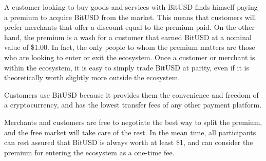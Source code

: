 A customer looking to buy goods and services with BitUSD finds himself paying a
premium to acquire BitUSD from the market. This means that customers will
prefer merchants that offer a discount equal to the premium paid. On the other
hand, the premium is a wash for a customer that earned BitUSD at a nominal
value of \$1.00. In fact, the only people to whom the premium matters are those
who are looking to enter or exit the ecosystem. Once a customer or merchant is
within the ecosystem, it is easy to simply trade BitUSD at parity, even if it
is theoretically worth slightly more outside the ecosystem.

Customers use BitUSD because it provides them the convenience and freedom of a
cryptocurrency, and has the lowest transfer fees of any other payment platform.

Merchants and customers are free to negotiate the best way to split the
premium, and the free market will take care of the rest. In the mean time, all
participants can rest assured that BitUSD is always worth at least \$1, and can
consider the premium for entering the ecosystem as a one-time fee.
